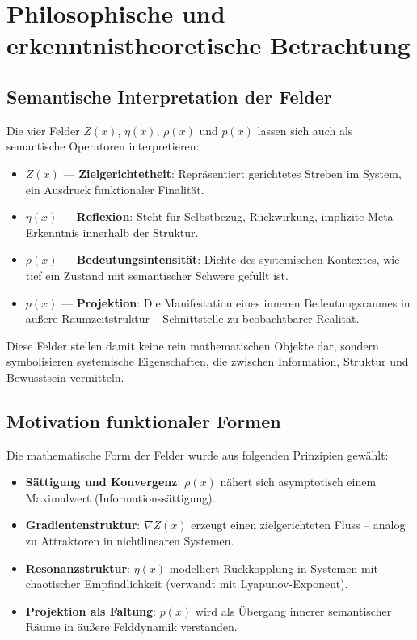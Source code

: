 \documentclass[11pt]{article}
\begin{document}
\section*{Philosophische und erkenntnistheoretische Betrachtung}

\subsection*{Semantische Interpretation der Felder}

Die vier Felder $Z(x)$, $\eta(x)$, $\rho(x)$ und $p(x)$ lassen sich auch als semantische Operatoren interpretieren:

\begin{itemize}
  \item $Z(x)$ — \textbf{Zielgerichtetheit}: Repräsentiert gerichtetes Streben im System, ein Ausdruck funktionaler Finalität.
  \item $\eta(x)$ — \textbf{Reflexion}: Steht für Selbstbezug, Rückwirkung, implizite Meta-Erkenntnis innerhalb der Struktur.
  \item $\rho(x)$ — \textbf{Bedeutungsintensität}: Dichte des systemischen Kontextes, wie tief ein Zustand mit semantischer Schwere gefüllt ist.
  \item $p(x)$ — \textbf{Projektion}: Die Manifestation eines inneren Bedeutungsraumes in äußere Raumzeitstruktur – Schnittstelle zu beobachtbarer Realität.
\end{itemize}

Diese Felder stellen damit keine rein mathematischen Objekte dar,  
sondern symbolisieren systemische Eigenschaften, die zwischen Information, Struktur und Bewusstsein vermitteln.

\subsection*{Motivation funktionaler Formen}

Die mathematische Form der Felder wurde aus folgenden Prinzipien gewählt:

\begin{itemize}
  \item \textbf{Sättigung und Konvergenz}: $\rho(x)$ nähert sich asymptotisch einem Maximalwert (Informationssättigung).
  \item \textbf{Gradientenstruktur}: $\nabla Z(x)$ erzeugt einen zielgerichteten Fluss – analog zu Attraktoren in nichtlinearen Systemen.
  \item \textbf{Resonanzstruktur}: $\eta(x)$ modelliert Rückkopplung in Systemen mit chaotischer Empfindlichkeit (verwandt mit Lyapunov-Exponent).
  \item \textbf{Projektion als Faltung}: $p(x)$ wird als Übergang innerer semantischer Räume in äußere Felddynamik verstanden.
\end{itemize}
\end{document}

